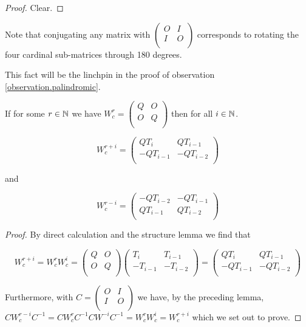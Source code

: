 \begin{proof}
  Clear.
\end{proof}

Note that conjugating any matrix with
$\left(\begin{smallmatrix} O & I \\ I & O \\\end{smallmatrix}\right)$ 
corresponds to rotating the four cardinal sub-matrices through 180 degrees.

This fact will be the linchpin in the proof of observation
\ref{observation.palindromic}.

\begin{lemma}
  If for some $r\in\mathbb{N}$ we have $W_{c}^{r} = \left(\begin{smallmatrix} Q & O \\ O & Q \\\end{smallmatrix}\right)$ then for all $i\in\mathbb{N}$.

  \[
  W_{c}^{r+i} = \left(\begin{array}{cc} QT_{i} & QT_{i-1} \\ -QT_{i-1} & -QT_{i-2} \\\end{array}\right)
  \]

  and

  \[
  W_{c}^{r-i} = \left(\begin{array}{cc} -QT_{i-2} & -QT_{i-1} \\ QT_{i-1} & QT_{i-2} \\\end{array}\right)
  \]
\end{lemma}

\begin{proof}
  By direct calculation and the structure lemma we find that

  \[
  W_{c}^{r+i}
  =
  W_{c}^{r}W_{c}^{i}
  =
  \left(
  \begin{array}{cc}
    Q & O \\
    O & Q \\
  \end{array}
  \right)
  \left(
  \begin{array}{cc}
     T_{i} &  T_{i-1}  \\
    -T_{i-1} & -T_{i-2} \\
  \end{array}
  \right)
  =
  \left(
  \begin{array}{cc}
     QT_{i} &  QT_{i-1}  \\
    -QT_{i-1} & -QT_{i-2} \\
  \end{array}
  \right)
  \]

  Furthermore, with $C=\left(\begin{smallmatrix} O & I \\ I & O \\\end{smallmatrix}\right)$
  we have, by the preceding lemma,
  $CW_{c}^{r-i}C^{-1}=CW_{c}^{r}C^{-1}CW^{-i}C^{-1}=W_{c}^{r}W_{c}^{i}=W_{c}^{r+i}$
  which we set out to prove.
\end{proof}

